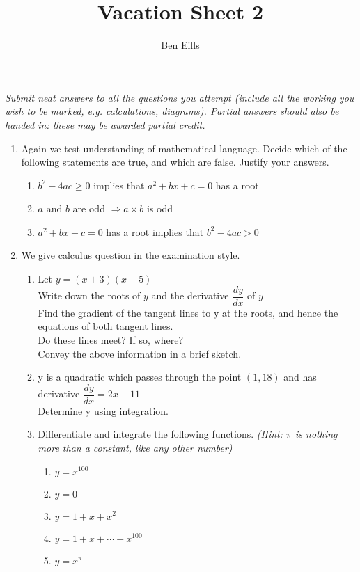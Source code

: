 \documentclass{article}
\begin{document}
\title{Vacation Sheet 2}
\author{Ben Eills}
\maketitle

\textit{Submit neat answers to all the questions you attempt (include all the working you wish to be marked, e.g. calculations, diagrams).  Partial answers should also be handed in: these may be awarded partial credit.}

\begin{enumerate}
	\item Again we test understanding of mathematical language.  Decide which of the following statements are true, and which are false.  Justify your answers.
		\begin{enumerate}
			\item $b^2-4ac \geq 0$ implies that $a^2+bx+c=0$ has a root
			\item $a$ and $b$ are odd $\Rightarrow a \times b$ is odd
			\item $a^2+bx+c=0$ has a root implies that $b^2-4ac > 0$
		\end{enumerate}
	
	\item We give calculus question in the examination style.
		\begin{enumerate}
			\item Let $y = (x+3)(x-5)$ \\
			Write down the roots of $y$ and the derivative $\dfrac{dy}{dx}$ of $y$ \\
			Find the gradient of the tangent lines to y at the roots, and hence the equations of both tangent lines. \\
			Do these lines meet? If so, where? \\
			Convey the above information in a brief sketch.

			\item y is a quadratic which passes through the point $(1, 18)$ and has derivative $\dfrac{dy}{dx} = 2x - 11$ \\
			Determine y using integration.
			
			\item Differentiate and integrate the following functions. \textit{(Hint: $\pi$ is nothing more than a constant, like any other number)}
			
			\begin{enumerate}
				\item $y = x^{100}$
				\item $y = 0$
				\item $y = 1 + x + x^2$
				\item $y = 1 + x + \cdots + x^{100}$
				\item $y = x^\pi$
			\end{enumerate}
\end{enumerate}



\end{enumerate}
\end{document}
